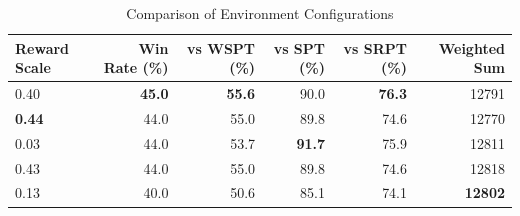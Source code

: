 \begin{table}[htbp]%
\centering%
\begin{tabular}{lrrrrr}%
\toprule%
\textbf{Reward Scale}&\textbf{Win Rate (\%)}&\textbf{vs WSPT (\%)}&\textbf{vs SPT (\%)}&\textbf{vs SRPT (\%)}&\textbf{Weighted Sum}\\%
\midrule%
0.40&\textbf{45.0}&\textbf{55.6}&90.0&\textbf{76.3}&12791\\%
\textbf{0.44}&44.0&55.0&89.8&74.6&12770\\%
0.03&44.0&53.7&\textbf{91.7}&75.9&12811\\%
0.43&44.0&55.0&89.8&74.6&12818\\%
0.13&40.0&50.6&85.1&74.1&\textbf{12802}\\%
\bottomrule%
\end{tabular}%
\caption{Comparison of Environment Configurations}%
\label{tab:environment}%
\end{table}